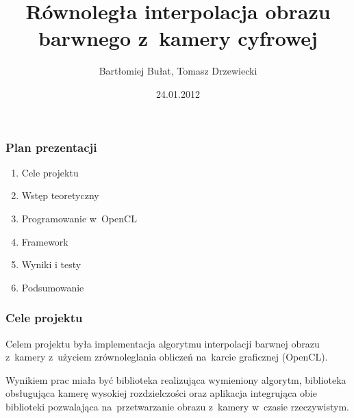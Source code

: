 \documentclass{beamer}
\title[Interpolacja barwna obrazu]{Równoległa interpolacja obrazu barwnego
  z~kamery cyfrowej}
\author[B. Bułat, T. Drzewiecki]{Bartłomiej Bułat, Tomasz Drzewiecki}
\date[2011]{24.01.2012}
\institute[AGH]
{Wydział EAIiIB\\ 
Katedra Automatyki i~Inżynierii Biomedycznej
}
\begin{document}
{
 \begin{frame}
   \titlepage
 \end{frame}
}



\begin{frame}
\frametitle{Plan prezentacji}
	
  \begin{enumerate}
  	\item Cele projektu
	  \item Wstęp teoretyczny
  	\item Programowanie w~OpenCL
  	\item Framework
  	\item Wyniki i testy
  	\item Podsumowanie
	\end{enumerate}

\end{frame}

\begin{frame}
	\frametitle{Cele projektu}
	
  Celem projektu była implementacja algorytmu interpolacji barwnej obrazu z~kamery
  z~użyciem zrównoleglania obliczeń na~karcie graficznej (OpenCL). 
  
  Wynikiem prac miała być
  biblioteka realizująca wymieniony algorytm, biblioteka obsługująca kamerę wysokiej rozdzielczości
  oraz aplikacja integrująca obie biblioteki pozwalająca na~przetwarzanie obrazu z~kamery w~czasie 
  rzeczywistym.  
\end{frame}
\end{document}
